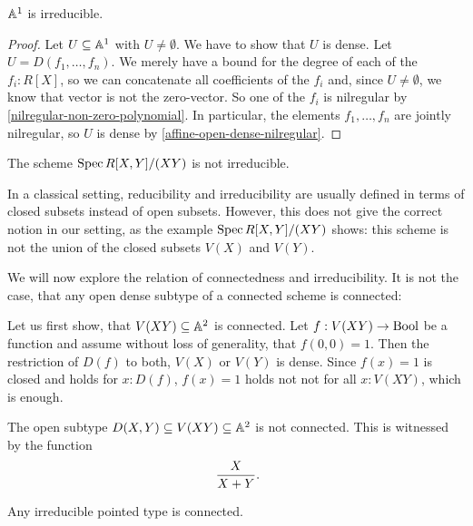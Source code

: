 \begin{proposition}%
  \label{A1-irreducible}
  $\mathbb{A}^1$ is irreducible.
\end{proposition}

\begin{proof}
  Let $U\subseteq \mathbb{A}^1$ with $U\neq \emptyset$.
  We have to show that $U$ is dense.
  Let $U=D(f_1,\dots,f_n)$.
  We merely have a bound for the degree of each of the $f_i:R[X]$,
  so we can concatenate all coefficients of the $f_i$ and, since $U\neq \emptyset$,
  we know that vector is not the zero-vector.
  So one of the $f_i$ is nilregular by \cref{nilregular-non-zero-polynomial}.
  In particular,
  the elements $f_1, \dots, f_n$ are jointly nilregular,
  so $U$ is dense by \cref{affine-open-dense-nilregular}.
\end{proof}

\begin{example}
  The scheme $\operatorname{Spec} R[X,Y]/(XY)$ is not irreducible.
\end{example}

\begin{remark}
  In a classical setting,
  reducibility and irreducibility are usually defined
  in terms of closed subsets instead of open subsets.
  However, this does not give the correct notion in our setting,
  as the example $\operatorname{Spec} R[X, Y]/(XY)$ shows:
  this scheme is not the union of the closed subsets $V(X)$ and $V(Y)$.
\end{remark}

We will now explore the relation of connectedness and irreducibility.
It is not the case, that any open dense subtype of a connected scheme is connected:

\begin{example}
  Let us first show,
  that $V(XY)\subseteq \mathbb{A}^2$ is connected.
  Let $f:V(XY)\to \mathrm{Bool}$ be a function and assume without loss of generality,
  that $f(0,0)=1$.
  Then the restriction of $D(f)$ to both, $V(X)$ or $V(Y)$ is dense.
  Since $f(x)=1$ is closed and holds for $x:D(f)$, $f(x)=1$ holds not not for all $x:V(XY)$,
  which is enough.
    
  The open subtype $D(X,Y)\subseteq V(XY)\subseteq \mathbb{A}^2$ is not connected.
  This is witnessed by the function
  \[
    \frac{X}{X+Y}
    \rlap{.}
  \]
\end{example}

\begin{proposition}%
  \label{irreducible-implies-connected}
  Any irreducible pointed type is connected.
\end{proposition}

